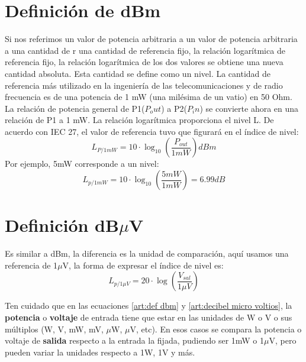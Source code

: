 \documentclass[
	12pt, %
	fleqn, %
	a4paper, %
	oneside, %
]{LegrandOrangeBook}
\begin{document}
\section{Definición de dBm}
Si nos referimos un valor de potencia arbitraria a un valor de potencia arbitraria a una cantidad de r una cantidad de referencia fijo, la relación logarítmica de referencia fijo, la relación logarítmica de los dos valores se obtiene una nueva cantidad absoluta. Esta cantidad se define como un nivel. La cantidad de referencia más utilizado en la ingeniería de las telecomunicaciones y de radio frecuencia es de una potencia de 1 mW (una milésima de un vatio) en 50 Ohm. La relación de potencia general de P1($P_out$) a P2($P_in$) se convierte ahora en una relación de P1 a 1 mW. La relación logarítmica proporciona el nivel L. De acuerdo con IEC 27, el valor de referencia tuvo que figurará en el índice de nivel:
\begin{equation}\label{art:def dbm}
L_{P/1mW}=10\cdot \log_{10}\left(\frac{P_{out}}{1mW}\right)dBm
\end{equation}
Por ejemplo, 5mW corresponde a un nivel:
\begin{displaymath}
L_{p/1mW}=10\cdot \log_{10}\left(\frac{5mW}{1mW}\right)=6.99dB
\end{displaymath}
\section{Definición dB$\mu$V}
Es similar a dBm, la diferencia es la unidad de comparación, aquí usamos una referencia de 1$\mu$V, la forma de expresar el índice de nivel es:
\begin{equation}
\label{art:decibel micro voltios}
L_{p/1\mu V}=20\cdot\log\left(\frac{V_{sal}}{1\mu V}\right)
\end{equation}
\begin{remark}
Ten cuidado que en las ecuaciones \ref{art:def dbm} y \ref{art:decibel micro voltios}, la \textbf{potencia} o \textbf{voltaje} de entrada tiene que estar en las unidades de W o V o sus múltiplos (W, V, mW, mV, $\mu$W, $\mu$V, etc). En esos casos se compara la potencia o voltaje de \textbf{salida} respecto a la entrada la fijada, pudiendo ser 1mW o 1$\mu$V, pero pueden variar la unidades respecto a 1W, 1V y más.
\end{remark}
\end{document}
